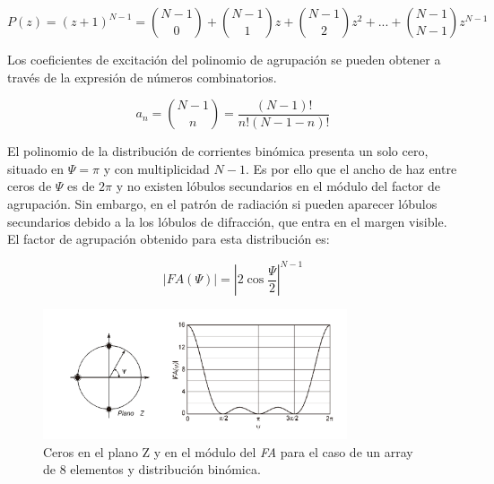 \begin{equation}
	P(z)=(z+1)^{N-1}=\binom{N-1}{0}+\binom{N-1}{1}z+\binom{N-1}{2}z^{2}+...+\binom{N-1}{N-1}z^{N-1}
	\label{eq:newton}
\end{equation}

\par Los coeficientes de excitación del polinomio de agrupación se pueden obtener a través de la expresión de números combinatorios. 

\begin{equation}
	a_{n}=\binom{N-1}{n}=\frac{\left ( N-1 \right )!}{n!\left ( N-1-n \right )!}
	\label{eq:combinatorios}
\end{equation}

\par El polinomio de la distribución de corrientes binómica presenta un solo cero, situado en $\Psi=\pi$ y con multiplicidad $N-1$. Es por ello que el ancho de haz entre ceros de $\Psi$ es de $2\pi$ y no existen lóbulos secundarios en el módulo del factor de agrupación. Sin embargo, en el patrón de radiación si pueden aparecer lóbulos secundarios debido a la los lóbulos de difracción, que entra en el margen visible. El factor de agrupación obtenido para esta distribución es: 

\begin{equation}
	\left | FA (\Psi) \right |=\left | 2\cos\frac{\Psi}{2} \right |^{N-1}	
	\label{eq:Fabinom}
\end{equation}

\begin{figure}[h]
    \centering
        \includegraphics[width=0.8\textwidth]{archivos/array/triangular}
        \caption{Ceros en el plano Z y en el módulo del \textit{FA} para el caso de un array de 8 elementos y distribución binómica. \citep{Cardama2002}}
        \label{fig:cerosbinom}
\end{figure}


